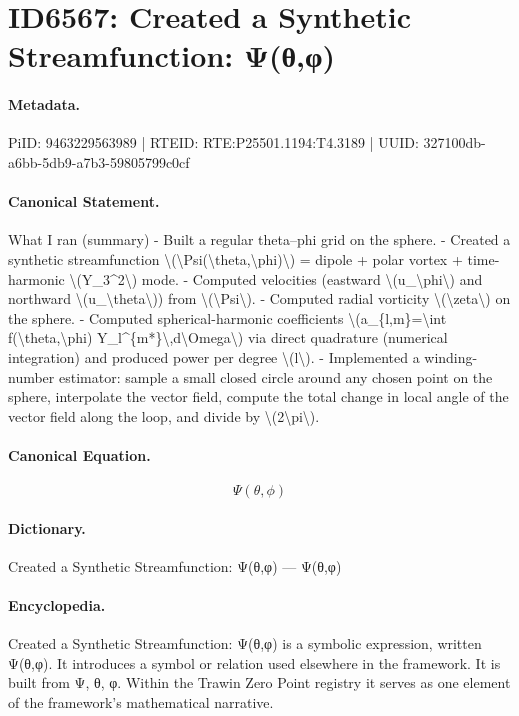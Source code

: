 \section*{ID6567: Created a Synthetic Streamfunction: Ψ(θ,φ)}
\paragraph{Metadata.}
PiID: 9463229563989 | RTEID: RTE:P25501.1194:T4.3189 | UUID: 327100db-a6bb-5db9-a7b3-59805799c0cf

\paragraph{Canonical Statement.}
What I ran (summary) - Built a regular theta–phi grid on the sphere. - Created a synthetic streamfunction \textbackslash{}(\textbackslash{}Psi(\textbackslash{}theta,\textbackslash{}phi)\textbackslash{}) = dipole + polar vortex + time-harmonic \textbackslash{}(Y\_3\textasciicircum{}2\textbackslash{}) mode. - Computed velocities (eastward \textbackslash{}(u\_\textbackslash{}phi\textbackslash{}) and northward \textbackslash{}(u\_\textbackslash{}theta\textbackslash{})) from \textbackslash{}(\textbackslash{}Psi\textbackslash{}). - Computed radial vorticity \textbackslash{}(\textbackslash{}zeta\textbackslash{}) on the sphere. - Computed spherical-harmonic coefficients \textbackslash{}(a\_\{l,m\}=\textbackslash{}int f(\textbackslash{}theta,\textbackslash{}phi) Y\_l\textasciicircum{}\{m*\}\textbackslash{},d\textbackslash{}Omega\textbackslash{}) via direct quadrature (numerical integration) and produced power per degree \textbackslash{}(l\textbackslash{}). - Implemented a winding-number estimator: sample a small closed circle around any chosen point on the sphere, interpolate the vector field, compute the total change in local angle of the vector field along the loop, and divide by \textbackslash{}(2\textbackslash{}pi\textbackslash{}).

\paragraph{Canonical Equation.}
\[
\Psi(\theta,\phi)
\]

\paragraph{Dictionary.}
Created a Synthetic Streamfunction: Ψ(θ,φ) — Ψ(θ,φ)

\paragraph{Encyclopedia.}
Created a Synthetic Streamfunction: Ψ(θ,φ) is a symbolic expression, written Ψ(θ,φ). It introduces a symbol or relation used elsewhere in the framework. It is built from Ψ, θ, φ. Within the Trawin Zero Point registry it serves as one element of the framework's mathematical narrative.
